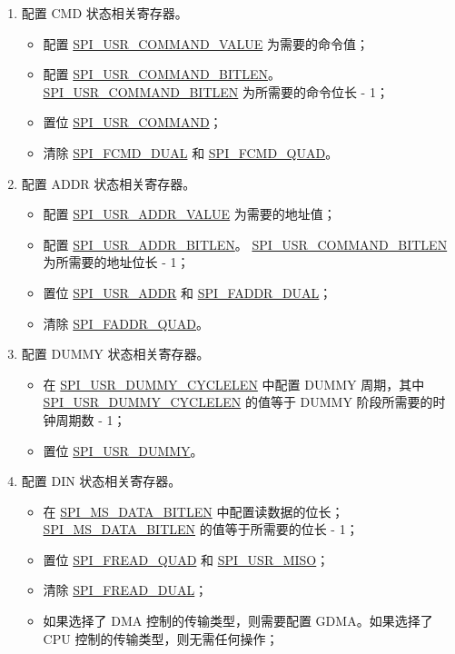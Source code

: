 \documentclass[main\_\_CN.tex]{subfiles}
\begin{document}
\begin{enumerate}
    \item 配置 CMD 状态相关寄存器。
        \begin{itemize}
            \item 配置 \hyperref[fielddesc:SPIUSRCOMMANDVALUE]{SPI\_USR\_COMMAND\_VALUE} 为需要的命令值；
            \item 配置 \hyperref[fielddesc:SPIUSRCOMMANDBITLEN]{SPI\_USR\_COMMAND\_BITLEN}。 \hyperref[fielddesc:SPIUSRCOMMANDBITLEN]{SPI\_USR\_COMMAND\_BITLEN} 为所需要的命令位长 - 1；
            \item 置位 \hyperref[fielddesc:SPIUSRCOMMAND]{SPI\_USR\_COMMAND}；
            \item 清除 \hyperref[fielddesc:SPIFCMDDUAL]{SPI\_FCMD\_DUAL} 和 \hyperref[fielddesc:SPIFCMDQUAD]{SPI\_FCMD\_QUAD}。
        \end{itemize}

    \item 配置 ADDR 状态相关寄存器。
        \begin{itemize}
            \item 配置 \hyperref[fielddesc:SPIUSRADDRVALUE]{SPI\_USR\_ADDR\_VALUE} 为需要的地址值；
            \item 配置 \hyperref[fielddesc:SPIUSRADDRBITLEN]{SPI\_USR\_ADDR\_BITLEN}。 \hyperref[fielddesc:SPIUSRADDRBITLEN]{SPI\_USR\_COMMAND\_BITLEN} 为所需要的地址位长 - 1；
            \item 置位 \hyperref[fielddesc:SPIUSRADDR]{SPI\_USR\_ADDR} 和 \hyperref[fielddesc:SPIFADDRDUAL]{SPI\_FADDR\_DUAL}；
            \item 清除 \hyperref[fielddesc:SPIFADDRQUAD]{SPI\_FADDR\_QUAD}。
        \end{itemize}

    \item 配置 DUMMY 状态相关寄存器。
        \begin{itemize}
            \item 在 \hyperref[fielddesc:SPIUSRDUMMYCYCLELEN]{SPI\_USR\_DUMMY\_CYCLELEN} 中配置 DUMMY 周期，其中 \hyperref[fielddesc:SPIUSRDUMMYCYCLELEN]{SPI\_USR\_DUMMY\_CYCLELEN} 的值等于 DUMMY 阶段所需要的时钟周期数 - 1；
            \item 置位 \hyperref[fielddesc:SPIUSRDUMMY]{SPI\_USR\_DUMMY}。
        \end{itemize}

    \item 配置 DIN 状态相关寄存器。
        \begin{itemize}
            \item 在 \hyperref[fielddesc:SPIMSDATABITLEN]{SPI\_MS\_DATA\_BITLEN} 中配置读数据的位长； \hyperref[fielddesc:SPIMSDATABITLEN]{SPI\_MS\_DATA\_BITLEN} 的值等于所需要的位长 - 1；
            \item 置位 \hyperref[fielddesc:SPIFREADQUAD]{SPI\_FREAD\_QUAD} 和 \hyperref[fielddesc:SPIUSRMISO]{SPI\_USR\_MISO}；
            \item 清除 \hyperref[fielddesc:SPIFREADDUAL]{SPI\_FREAD\_DUAL}；
            \item 如果选择了 DMA 控制的传输类型，则需要配置 GDMA。如果选择了 CPU 控制的传输类型，则无需任何操作；
        \end{itemize}


\end{enumerate}
\end{document}
